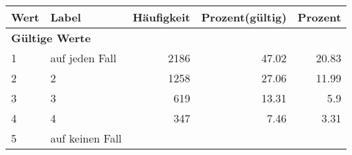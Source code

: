      \begin{longtable}{lXrrr}
     \toprule
     \textbf{Wert} & \textbf{Label} & \textbf{Häufigkeit} & \textbf{Prozent(gültig)} & \textbf{Prozent} \\
     \endhead
     \midrule
     \multicolumn{5}{l}{\textbf{Gültige Werte}}\\

     1 &
     \multicolumn{1}{X}{ auf jeden Fall   } &


       \num{2186} &
       \num[round-mode=places,round-precision=2]{47.02} &
         \num[round-mode=places,round-precision=2]{20.83} \\

     2 &
     \multicolumn{1}{X}{ 2   } &


       \num{1258} &
       \num[round-mode=places,round-precision=2]{27.06} &
         \num[round-mode=places,round-precision=2]{11.99} \\

     3 &
     \multicolumn{1}{X}{ 3   } &


       \num{619} &
       \num[round-mode=places,round-precision=2]{13.31} &
         \num[round-mode=places,round-precision=2]{5.9} \\

     4 &
     \multicolumn{1}{X}{ 4   } &


       \num{347} &
       \num[round-mode=places,round-precision=2]{7.46} &
         \num[round-mode=places,round-precision=2]{3.31} \\

     5 &
     \multicolumn{1}{X}{ auf keinen Fall   } &



\end{longtable}
